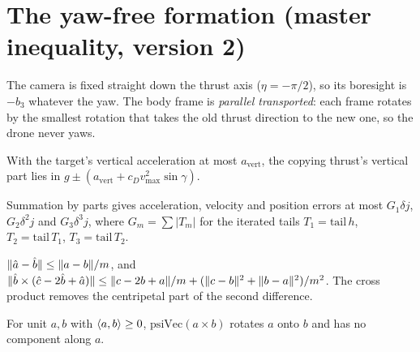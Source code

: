 \chapter{The yaw-free formation (master inequality, version 2)}
\label{chap:yawfree}

The camera is fixed straight down the thrust axis ($\eta=-\pi/2$), so its boresight is
$-b_3$ whatever the yaw. The body frame is \emph{parallel transported}: each frame
rotates by the smallest rotation that takes the old thrust direction to the new one,
so the drone never yaws.

\begin{lemma}
\label{lem:avert}
\leanok
{}
With the target's vertical acceleration at most $a_{\mathrm{vert}}$, the copying
thrust's vertical part lies in $g\pm(a_{\mathrm{vert}}+c_Dv_{\max}^2\sin\gamma)$.
\end{lemma}

\begin{theorem}
\label{thm:sharp-planner}
\leanok
{}
Summation by parts gives acceleration, velocity and position errors at most $G_1\delta j$,
$G_2\delta^2j$ and $G_3\delta^3j$, where $G_m=\sum|T_m|$ for the iterated tails
$T_1=\mathrm{tail}\,h$, $T_2=\mathrm{tail}\,T_1$, $T_3=\mathrm{tail}\,T_2$.
\end{theorem}

\begin{lemma}
\label{lem:sharp-norm}
\leanok
{}
$\lVert \hat a-\hat b \rVert\le\lVert a-b \rVert/m$, and
$\lVert \hat b\times(\hat c-2\hat b+\hat a) \rVert\le\lVert c-2b+a \rVert/m+(\lVert c-b \rVert^2+\lVert b-a \rVert^2)/m^2$.
The cross product removes the centripetal part of the second difference.
\end{lemma}

\begin{lemma}
\label{lem:minrot}
\leanok
{}
For unit $a,b$ with $\langle a, b \rangle\ge0$, $\mathrm{psiVec}(a\times b)$ rotates $a$ onto $b$ and has
no component along $a$.
\end{lemma}

